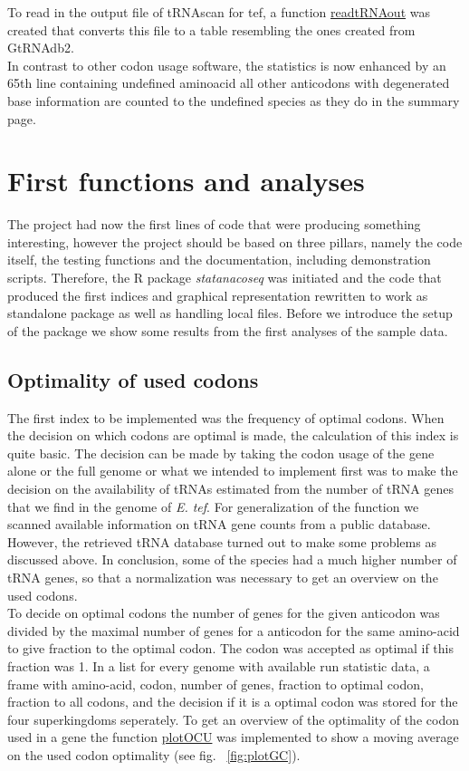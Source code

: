 To read in the output file of tRNAscan for tef, a function \hyperlink{function:rtRNAo}{readtRNAout} was created that converts this file to a table resembling the ones created from GtRNAdb2. \\

In contrast to other codon usage software, the statistics is now enhanced by an 65th line containing undefined aminoacid all other anticodons with degenerated base information are counted to the undefined species as they do in the summary page. \\ 

\section{First functions and analyses}
The project had now the first lines of code that were producing something interesting, however the project should be based on three pillars, namely the code itself, the testing functions and the documentation, including demonstration scripts. Therefore, the R package \textit{statanacoseq} was initiated and the code that produced the first indices and graphical representation rewritten to work as standalone package as well as handling local files. Before we introduce the setup of the package we show some results from the first analyses of the sample data.

\subsection{Optimality of used codons}
The first index to be implemented was the frequency of optimal codons. When the decision on which codons are optimal is made, the calculation of this index is quite basic. The decision can be made by taking the codon usage of the gene alone or the full genome or what we intended to implement first was to make the decision on the availability of tRNAs estimated from the number of tRNA genes that we find in the genome of \textit{E. tef}. For generalization of the function we scanned available information on tRNA gene counts from a public database. However, the retrieved tRNA database turned out to make some problems as discussed above. In conclusion, some of the species had a much higher number of tRNA genes, so that a normalization was necessary to get an overview on the used codons. \\

To decide on optimal codons the number of genes for the given anticodon was divided by the maximal number of genes for a anticodon for the same amino-acid to give fraction to the optimal codon. The codon was accepted as optimal if this fraction was 1. In a list for every genome with available run statistic data, a frame with amino-acid, codon, number of genes, fraction to optimal codon, fraction to all codons, and the decision if it is a optimal codon was stored for the four superkingdoms seperately. To get an overview of the optimality of the codon used in a gene the function \hyperlink{function:plotOCU}{plotOCU} was implemented to show a moving average on the used codon optimality (see fig. ~\ref{fig:plotGC}). \\

